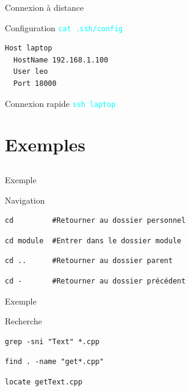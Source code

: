 \documentclass{beamer}
\begin{document}
\begin{frame}[fragile]{Connexion à distance}
\begin{block}{Configuration}
\textcolor{cyan}{\verb?cat .ssh/config?}
\begin{verbatim}
Host laptop
  HostName 192.168.1.100
  User leo
  Port 18000
\end{verbatim}
\end{block}

\begin{block}{Connexion rapide}
\textcolor{cyan}{\verb?ssh laptop?} 
\end{block}
\end{frame}


\section{Exemples}

\subsection{}

\begin{frame}[fragile]{Exemple}
\begin{block}{Navigation}
\begin{verbatim}
cd         #Retourner au dossier personnel
\end{verbatim}
\begin{verbatim}
cd module  #Entrer dans le dossier module
\end{verbatim}
\begin{verbatim}
cd ..      #Retourner au dossier parent
\end{verbatim}
\begin{verbatim}
cd -       #Retourner au dossier précédent
\end{verbatim}
\end{block}
\end{frame}



\begin{frame}[fragile]{Exemple}
\begin{block}{Recherche}
\begin{verbatim}
grep -sni "Text" *.cpp
\end{verbatim}
\begin{verbatim}
find . -name "get*.cpp"
\end{verbatim}
\begin{verbatim}
locate getText.cpp
\end{verbatim}
\end{block}
\end{frame}
\end{document}
